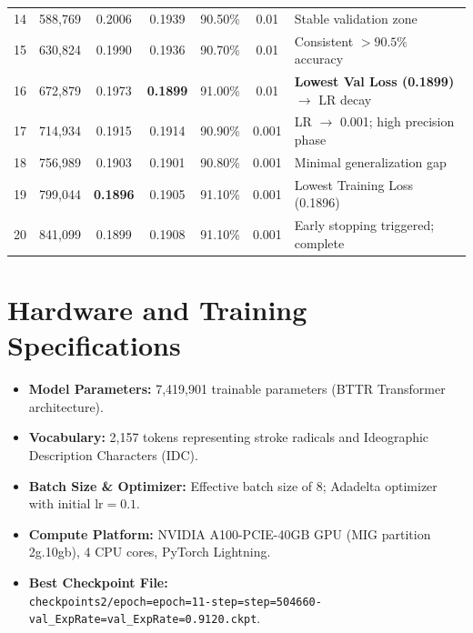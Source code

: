 \documentclass[11pt,a4paper]{article}
\begin{document}
\begin{center}
\begin{tabular*}{\textwidth}{@{\extracolsep{\fill}}ccccccp{4.5cm}}
14 & 588,769 & 0.2006 & 0.1939 & 90.50\% & 0.01 & Stable validation zone \\
15 & 630,824 & 0.1990 & 0.1936 & 90.70\% & 0.01 & Consistent $>90.5\%$ accuracy \\
\rowcolor{bestgreen}
16 & 672,879 & 0.1973 & \textbf{0.1899} & 91.00\% & 0.01 & \textbf{Lowest Val Loss (0.1899)} $\to$ LR decay \\
\midrule
17 & 714,934 & 0.1915 & 0.1914 & 90.90\% & 0.001 & LR $\to$ 0.001; high precision phase \\
18 & 756,989 & 0.1903 & 0.1901 & 90.80\% & 0.001 & Minimal generalization gap \\
19 & 799,044 & \textbf{0.1896} & 0.1905 & 91.10\% & 0.001 & Lowest Training Loss (0.1896) \\
20 & 841,099 & 0.1899 & 0.1908 & 91.10\% & 0.001 & Early stopping triggered; complete \\
\bottomrule
\end{tabular*}
\end{center}

\vspace{0.6em}

\section{Hardware and Training Specifications}
\begin{itemize}[leftmargin=1.5em, itemsep=2pt]
    \item \textbf{Model Parameters:} 7,419,901 trainable parameters (BTTR Transformer architecture).
    \item \textbf{Vocabulary:} 2,157 tokens representing stroke radicals and Ideographic Description Characters (IDC).
    \item \textbf{Batch Size \& Optimizer:} Effective batch size of 8; Adadelta optimizer with initial $\text{lr}=0.1$.
    \item \textbf{Compute Platform:} NVIDIA A100-PCIE-40GB GPU (MIG partition 2g.10gb), 4 CPU cores, PyTorch Lightning.
    \item \textbf{Best Checkpoint File:} \\
    \texttt{\small checkpoints2/epoch=epoch=11-step=step=504660-val\_ExpRate=val\_ExpRate=0.9120.ckpt}.
\end{itemize}
\end{document}
